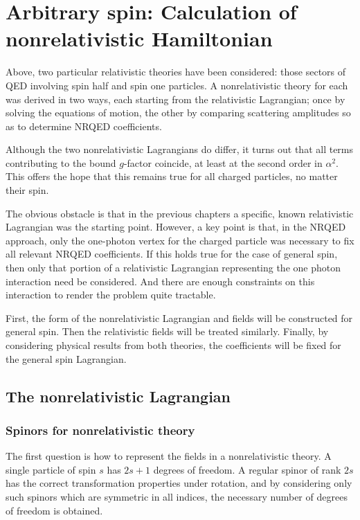 
\chapter{Arbitrary spin: Calculation of nonrelativistic Hamiltonian}

Above, two particular relativistic theories have been considered: those sectors of QED involving spin half and spin one particles.  A nonrelativistic theory for each was derived in two ways, each starting from the relativistic Lagrangian; once by solving the equations of motion, the other by comparing scattering amplitudes so as to determine NRQED coefficients.

Although the two nonrelativistic Lagrangians do differ, it turns out that all terms contributing to the bound $g$-factor coincide, at least at the second order in $\alpha^2$.  This offers the hope that this remains true for all charged particles, no matter their spin.

The obvious obstacle is that in the previous chapters a specific, known relativistic Lagrangian was the starting point.  However, a key point is that, in the NRQED approach, only the one-photon vertex for the charged particle was necessary to fix all relevant NRQED coefficients.  If this holds true for the case of general spin, then only that portion of a relativistic Lagrangian representing the one photon interaction need be considered.  And there are enough constraints on this interaction to render the problem quite tractable.

First, the form of the nonrelativistic Lagrangian and fields will be constructed for general spin.  Then the relativistic fields will be treated similarly.  Finally, by considering physical results from both theories, the coefficients will be fixed for the general spin Lagrangian.



\section{The nonrelativistic Lagrangian}
\subsection{Spinors for nonrelativistic theory}
The first question is how to represent the fields in a nonrelativistic theory.  A single particle of spin $s$ has $2s+1$ degrees of freedom.  A regular spinor of rank $2s$ has the correct transformation properties under rotation, and by considering only such spinors which are symmetric in all indices, the necessary number of degrees of freedom is obtained.


